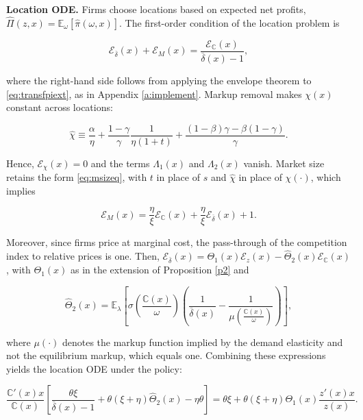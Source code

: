 \textbf{Location ODE.} Firms choose locations based on expected net profits, $\widehat{\Pi}(z,x) = \mathbb{E}_\omega[\widehat{\pi}(\omega,x)]$. The first-order condition of the location problem is

\begin{equation*}
	\mathcal{E}_{\overline{\delta}}(x) + \mathcal{E}_M(x) = \frac{\mathcal{E}_{\mathbb{C}}(x)}{\overline{\delta}(x) - 1},
\end{equation*}

where the right-hand side follows from applying the envelope theorem to \eqref{eq:transfpiext}, as in Appendix \ref{a:implement}. Markup removal makes $\chi(x)$ constant across locations:

\begin{equation*}
	\widehat{\chi} \equiv \frac{\alpha}{\eta} + \frac{1-\gamma}{\gamma}\frac{1}{\eta(1+t)} + \frac{(1-\beta)\gamma - \beta(1-\gamma)}{\gamma}.
\end{equation*}

Hence, $\mathcal{E}_\chi(x) = 0$ and the terms $\Lambda_1(x)$ and $\Lambda_2(x)$ vanish. Market size retains the form \eqref{eq:msizeq}, with $t$ in place of $s$ and $\widehat{\chi}$ in place of $\chi(\cdot)$, which implies

\begin{equation*}
	\mathcal{E}_{M}(x) = \frac{\eta}{\xi} \mathcal{E}_\mathbb{C}(x) +  \frac{\eta}{\xi} \mathcal{E}_{\overline{\delta}}(x) + 1.
\end{equation*}

Moreover, since firms price at marginal cost, the pass-through of the competition index to relative prices is one. Then, $\mathcal{E}_{\overline{\delta}}(x) = \Theta_1(x)\mathcal{E}_z(x) - \widehat{\Theta}_2(x)\mathcal{E}_{\mathbb{C}}(x)$, with $\Theta_1(x)$ as in the extension of Proposition \ref{p2} and

\begin{equation*}
	\widehat{\Theta}_2(x) = \mathbb{E}_\lambda\left[\sigma\left(\frac{\mathbb{C}(x)}{\omega}\right)\left(\frac{1}{\overline{\delta}(x)} - \frac{1}{\mu\left(\frac{\mathbb{C}(x)}{\omega}\right)}\right)\right],
\end{equation*}

where $\mu(\cdot)$ denotes the markup function implied by the demand elasticity and not the equilibrium markup, which equals one. Combining these expressions yields the location ODE under the policy:

\begin{equation}\label{eq:odeqopext}
	\frac{\mathbb{C}'(x)x}{\mathbb{C}(x)} \left[\frac{\theta\xi}{\overline{\delta}(x) -1 } + \theta(\xi + \eta)\widehat{\Theta}_2(x) -  \eta \theta \right] = \theta\xi + \theta(\xi + \eta) \Theta_1(x) \frac{z'(x)x}{z(x)}.
\end{equation}

